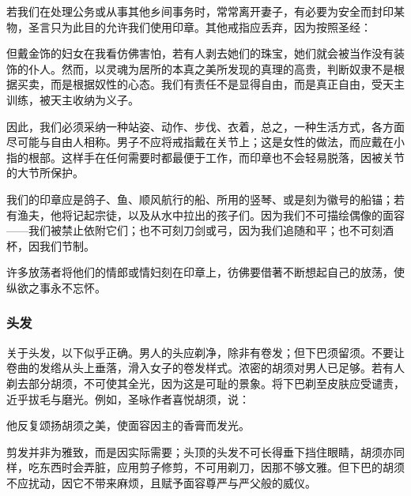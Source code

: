 若我们在处理公务或从事其他乡间事务时，常常离开妻子，有必要为安全而封印某物，圣言只为此目的允许我们使用印章。其他戒指应丢弃，因为按照圣经：\par

但戴金饰的妇女在我看仿佛害怕，若有人剥去她们的珠宝，她们就会被当作没有装饰的仆人。然而，以灵魂为居所的本真之美所发现的真理的高贵，判断奴隶不是根据买卖，而是根据奴性的心态。我们有责任不是显得自由，而是真正自由，受天主训练，被天主收纳为义子。\par

因此，我们必须采纳一种站姿、动作、步伐、衣着，总之，一种生活方式，各方面尽可能与自由人相称。男子不应将戒指戴在关节上；这是女性的做法，而应戴在小指的根部。这样手在任何需要时都最便于工作，而印章也不会轻易脱落，因被关节的大节所保护。\par

我们的印章应是鸽子、鱼、顺风航行的船、所用的竖琴、或是刻为徽号的船锚；若有渔夫，他将记起宗徒，以及从水中拉出的孩子们。因为我们不可描绘偶像的面容——我们被禁止依附它们；也不可刻刀剑或弓，因为我们追随和平；也不可刻酒杯，因我们节制。\par

许多放荡者将他们的情郎或情妇刻在印章上，彷佛要借著不断想起自己的放荡，使纵欲之事永不忘怀。\par


\subsubsection{头发}

关于头发，以下似乎正确。男人的头应剃净，除非有卷发；但下巴须留须。不要让卷曲的发绺从头上垂落，滑入女子的卷发样式。浓密的胡须对男人已足够。若有人剃去部分胡须，不可使其全光，因为这是可耻的景象。将下巴剃至皮肤应受谴责，近乎拔毛与磨光。例如，圣咏作者喜悦胡须，说：\par

他反复颂扬胡须之美，使面容因主的香膏而发光。\par

剪发并非为雅致，而是因实际需要；头顶的头发不可长得垂下挡住眼睛，胡须亦同样，吃东西时会弄脏，应用剪子修剪，不可用剃刀，因那不够文雅。但下巴的胡须不应扰动，因它不带来麻烦，且赋予面容尊严与严父般的威仪。\par

